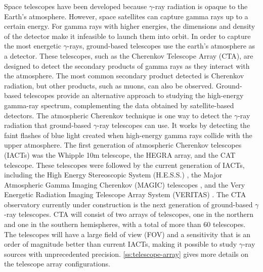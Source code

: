 Space telescopes have been developed because $\gamma$-ray radiation is opaque to the Earth's atmosphere. However, space satellites can capture gamma rays up to a certain energy. For gamma rays with higher energies, the dimensions and density of the detector make it infeasible to launch them into orbit. In order to capture the most energetic $\gamma$-rays, ground-based telescopes use the earth's atmosphere as a detector. These telescopes, such as the Cherenkov Telescope Array (CTA), are designed to detect the secondary products of gamma rays as they interact with the atmosphere. The most common secondary product detected is Cherenkov radiation, but other products, such as muons, can also be observed. Ground-based telescopes provide an alternative approach to studying the high-energy gamma-ray spectrum, complementing the data obtained by satellite-based detectors. The atmospheric Cherenkov technique is one way to detect the $\gamma$-ray radiation that ground-based $\gamma$-ray telescopes can use. It works by detecting the faint flashes of blue light created when high-energy gamma rays collide with the upper atmosphere. The first generation of atmospheric Cherenkov telescopes (IACTs) was the Whipple 10m telescope, the HEGRA array, and the CAT telescope. These telescopes were followed by the current generation of IACTs, including the High Energy Stereoscopic System (H.E.S.S.) \cite{hess_2000}, the Major Atmospheric Gamma Imaging Cherenkov (MAGIC) telescopes \cite{magic_1999}, and the Very Energetic Radiation Imaging Telescope Array System (VERITAS) \cite{weekes2002very}. The CTA observatory currently under construction is the next generation of ground-based $\gamma$-ray telescopes. CTA will consist of two arrays of telescopes, one in the northern and one in the southern hemispheres, with a total of more than 60 telescopes. The telescopes will have a large field of view (FOV) and a sensitivity that is an order of magnitude better than current IACTs, making it possible to study $\gamma$-ray sources with unprecedented precision. \autoref{ss:telescope-array} gives more details on the telescope array configurations.

